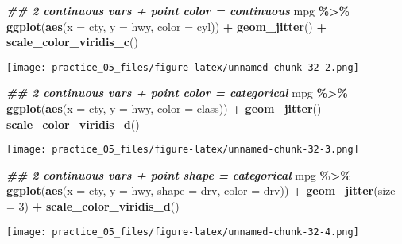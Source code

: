 \documentclass[
]{article}
\newenvironment{Shaded}{\begin{snugshade}}{\end{snugshade}}
\newcommand{\AttributeTok}[1]{\textcolor[rgb]{0.13,0.29,0.53}{#1}}
\newcommand{\DecValTok}[1]{\textcolor[rgb]{0.00,0.00,0.81}{#1}}
\newcommand{\DocumentationTok}[1]{\textcolor[rgb]{0.56,0.35,0.01}{\textbf{\textit{#1}}}}
\newcommand{\FunctionTok}[1]{\textcolor[rgb]{0.13,0.29,0.53}{\textbf{#1}}}
\newcommand{\NormalTok}[1]{#1}
\newcommand{\SpecialCharTok}[1]{\textcolor[rgb]{0.81,0.36,0.00}{\textbf{#1}}}
\begin{document}
\begin{Shaded}
\begin{Highlighting}[]
\DocumentationTok{\#\# 2 continuous vars + point color = continuous}
\NormalTok{mpg }\SpecialCharTok{\%\textgreater{}\%} 
  \FunctionTok{ggplot}\NormalTok{(}\FunctionTok{aes}\NormalTok{(}\AttributeTok{x =}\NormalTok{ cty,}
             \AttributeTok{y =}\NormalTok{ hwy,}
             \AttributeTok{color =}\NormalTok{ cyl)) }\SpecialCharTok{+}
  \FunctionTok{geom\_jitter}\NormalTok{() }\SpecialCharTok{+}
  \FunctionTok{scale\_color\_viridis\_c}\NormalTok{()}
\end{Highlighting}
\end{Shaded}

\texttt{[image: practice\_05\_files/figure-latex/unnamed-chunk-32-2.png]}

\begin{Shaded}
\begin{Highlighting}[]
\DocumentationTok{\#\# 2 continuous vars + point color = categorical}
\NormalTok{mpg }\SpecialCharTok{\%\textgreater{}\%} 
  \FunctionTok{ggplot}\NormalTok{(}\FunctionTok{aes}\NormalTok{(}\AttributeTok{x =}\NormalTok{ cty,}
             \AttributeTok{y =}\NormalTok{ hwy,}
             \AttributeTok{color =}\NormalTok{ class)) }\SpecialCharTok{+}
  \FunctionTok{geom\_jitter}\NormalTok{() }\SpecialCharTok{+}
  \FunctionTok{scale\_color\_viridis\_d}\NormalTok{()}
\end{Highlighting}
\end{Shaded}

\texttt{[image: practice\_05\_files/figure-latex/unnamed-chunk-32-3.png]}

\begin{Shaded}
\begin{Highlighting}[]
\DocumentationTok{\#\# 2 continuous vars + point shape = categorical}
\NormalTok{mpg }\SpecialCharTok{\%\textgreater{}\%} 
  \FunctionTok{ggplot}\NormalTok{(}\FunctionTok{aes}\NormalTok{(}\AttributeTok{x =}\NormalTok{ cty,}
             \AttributeTok{y =}\NormalTok{ hwy,}
             \AttributeTok{shape =}\NormalTok{ drv,}
             \AttributeTok{color =}\NormalTok{ drv)) }\SpecialCharTok{+}
  \FunctionTok{geom\_jitter}\NormalTok{(}\AttributeTok{size =} \DecValTok{3}\NormalTok{) }\SpecialCharTok{+}
  \FunctionTok{scale\_color\_viridis\_d}\NormalTok{()}
\end{Highlighting}
\end{Shaded}

\texttt{[image: practice\_05\_files/figure-latex/unnamed-chunk-32-4.png]}
\end{document}
